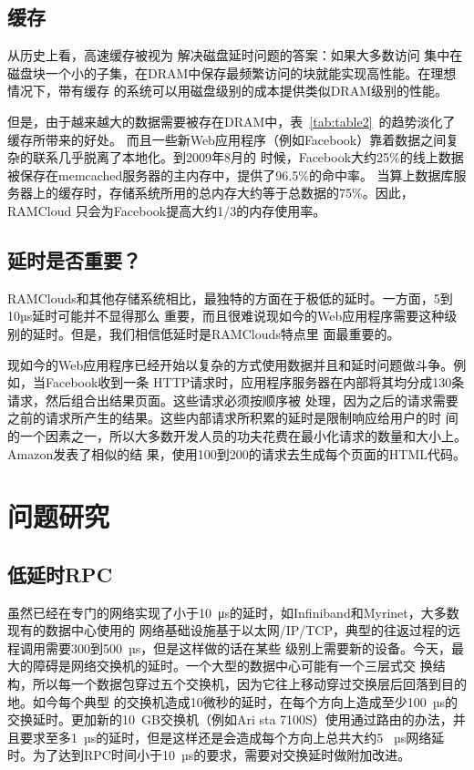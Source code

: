 \documentclass[translation]{zjutreport}
\begin{document}
\section{缓存}
从历史上看，高速缓存被视为
解决磁盘延时问题的答案：如果大多数访问
集中在磁盘块一个小的子集，在DRAM中保存最频繁访问的块就能实现高性能。在理想情况下，带有缓存
的系统可以用磁盘级别的成本提供类似DRAM级别的性能。

但是，由于越来越大的数据需要被存在DRAM中，表~\ref{tab:table2}~的趋势淡化了缓存所带来的好处。
而且一些新Web应用程序（例如Facebook）靠着数据之间复杂的联系几乎脱离了本地化。到2009年8月的
时候，Facebook大约25\%的线上数据被保存在memcached服务器的主内存中，提供了96.5\%的命中率。
当算上数据库服务器上的缓存时，存储系统所用的总内存大约等于总数据的75\%。因此，RAMCloud
只会为Facebook提高大约1/3的内存使用率。

\section{延时是否重要？}
RAMClouds和其他存储系统相比，最独特的方面在于极低的延时。一方面，5到10µs延时可能并不显得那么
重要，而且很难说现如今的Web应用程序需要这种级别的延时。但是，我们相信低延时是RAMClouds特点里
面最重要的。

现如今的Web应用程序已经开始以复杂的方式使用数据并且和延时问题做斗争。例如，当Facebook收到一条
HTTP请求时，应用程序服务器在内部将其均分成130条请求，然后组合出结果页面。这些请求必须按顺序被
处理，因为之后的请求需要之前的请求所产生的结果。这些内部请求所积累的延时是限制响应给用户的时
间的一个因素之一，所以大多数开发人员的功夫花费在最小化请求的数量和大小上。Amazon发表了相似的结
果，使用100到200的请求去生成每个页面的HTML代码。

\chapter{问题研究}
\section{低延时RPC}
虽然已经在专门的网络实现了小于10~μs的延时，如Infiniband和Myrinet，大多数现有的数据中心使用的
网络基础设施基于以太网/IP/TCP，典型的往返过程的远程调用需要300到500~µs，但是这样做的话在某些
级别上需要新的设备。今天，最大的障碍是网络交换机的延时。一个大型的数据中心可能有一个三层式交
换结构，所以每一个数据包穿过五个交换机，因为它往上移动穿过交换层后回落到目的地。如今每个典型
的交换机造成10微秒的延时，在每个方向上造成至少100~µs的交换延时。更加新的10~GB交换机（例如Ari
sta 7100S）使用通过路由的办法，并且要求至多1~µs的延时，但是这样还是会造成每个方向上总共大约5
~µs网络延时。为了达到RPC时间小于10~µs的要求，需要对交换延时做附加改进。
\end{document}
